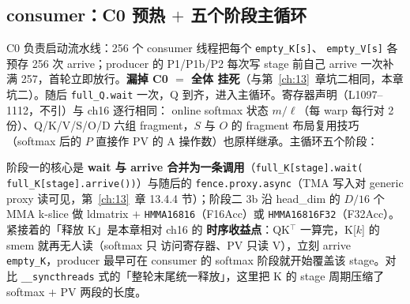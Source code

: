 \subsection{consumer：C0 预热 $+$ 五个阶段主循环}



C0 负责启动流水线：256 个 consumer 线程把每个 \texttt{empty\_K[s]}、
\texttt{empty\_V[s]} 各预存 256 次 arrive；producer 的 P1/P1b/P2 每次写
stage 前自己 arrive 一次补满 257，首轮立即放行。\textbf{漏掉 C0 $=$ 全体
挂死}（与第~\ref{ch:13}~章坑二相同，本章坑二）。随后 \texttt{full\_Q.wait}
一次，Q 到齐，进入主循环。寄存器声明（L1097--1112，不引）与 ch16 逐行相同：
online softmax 状态 $m/\ell$（每 warp 每行对 2 份）、Q/K/V/S/O/D 六组
fragment，$S$ 与 $O$ 的 fragment 布局复用技巧（softmax 后的 $P$ 直接作
PV 的 A 操作数）也原样继承。主循环五个阶段：





阶段一的核心是 \textbf{wait 与 arrive 合并为一条调用}（\texttt{full\_\allowbreak{}K[stage].\allowbreak{}wait\allowbreak{}(
full\_\allowbreak{}K[stage].\allowbreak{}arrive\allowbreak{}())}）与随后的 \texttt{fence.\allowbreak{}proxy.\allowbreak{}async}（TMA 写入对
generic proxy 读可见，第~\ref{ch:13}~章 13.4.4 节）；阶段二 3b 沿 head\_dim 的
$D/16$ 个 MMA k-slice 做 ldmatrix $+$ \texttt{HMMA16816}（F16Acc）或
\texttt{HMMA16816\allowbreak{}F32}（F32Acc）。紧接着的「释放 K」是本章相对 ch16 的
\textbf{时序收益点}：QK$^\top$ 一算完，K[$k$] 的 smem 就再无人读（softmax 只
访问寄存器、PV 只读 V），立刻 arrive \texttt{empty\_K}，producer 最早可在
consumer 的 softmax 阶段就开始覆盖该 stage。对比 \texttt{\_\allowbreak{}\_\allowbreak{}syncthreads}
式的「整轮末尾统一释放」，这里把 K 的 stage 周期压缩了 softmax $+$ PV
两段的长度。



